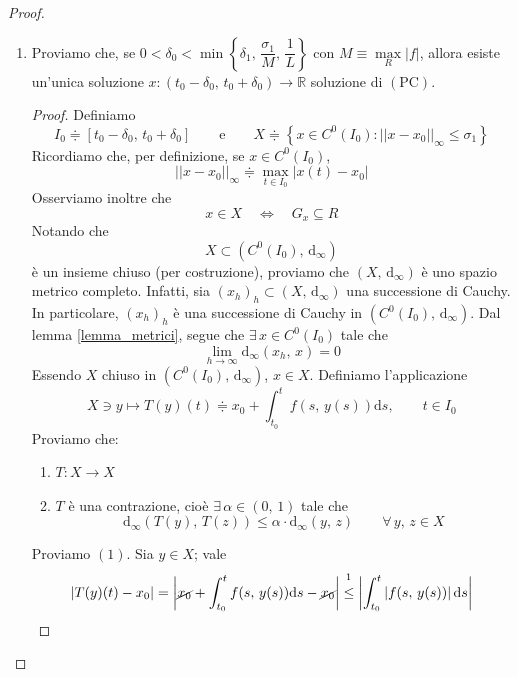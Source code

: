 \begin{proof}
\begin{enumerate}[labelindent=\parindent,leftmargin=*,label=\textnormal{\underline{Passo \arabic*}.},start=1]
	
	\item Proviamo che, se $0 < \delta_0 < \min\left\lbrace\delta_1,\,\dfrac{\sigma_1}{M},\,\dfrac{1}{L}\right\rbrace$ con $M \equiv \underset{R}{\max}|f|$, allora esiste un'unica soluzione $x: (t_0-\delta_0,\,t_0+\delta_0) \longrightarrow \mathbb{R}$ soluzione di $\mathrm{(PC)}$.
	\begin{proof}
	Definiamo
	$$
	I_0 \doteqdot [t_0-\delta_0,\,t_0+\delta_0]
	\qquad \text{e} \qquad
	X \doteqdot \left\lbrace x \in C^0(I_0) : ||x-x_0||_{\infty} \leq \sigma_1 \right\rbrace
	$$
	Ricordiamo che, per definizione, se $x \in C^0(I_0)$,
	$$
	||x-x_0||_{\infty} \doteqdot \underset{t \in I_0}{\max} |x(t) - x_0|
	$$
	Osserviamo inoltre che
	$$
	x \in X \quad \Longleftrightarrow \quad G_x \subseteq R
	$$
	Notando che
	$$
	X \subset \left( C^0(I_0),\,\mathrm{d}_{\infty} \right)
	$$
	è un insieme chiuso (per costruzione), proviamo che $\left( X,\,\mathrm{d}_{\infty} \right)$ è uno spazio metrico completo.
	Infatti, sia $(x_h)_h \subset (X,\,\mathrm{d}_{\infty})$ una successione di Cauchy. In particolare, $(x_h)_h$ è una successione di Cauchy in $\left( C^0(I_0),\,\mathrm{d}_{\infty} \right)$. Dal lemma \ref{lemma_metrici}, segue che $\exists \, x \in C^0(I_0)$ tale che
	$$
	\lim_{h \rightarrow \infty} \mathrm{d}_{\infty}(x_h,\,x) = 0
	$$
	Essendo $X$ chiuso in $\left( C^0(I_0),\,\mathrm{d}_{\infty} \right)$, $x \in X$. Definiamo l'applicazione
	$$
	X \ni y \longmapsto T(y)(t) \doteqdot x_0 + \int_{t_0}^t f(s,\,y(s))\mathrm{d}s, \qquad t \in I_0
	$$
	Proviamo che:
	\begin{enumerate}[labelindent=\parindent,leftmargin=*,label=\textnormal{(\arabic*)},start=1]
		\item $T: X \longrightarrow X$
		\item $T$ è una contrazione, cioè $\exists \, \alpha \in (0,\,1)$ tale che
		$$
		\mathrm{d}_{\infty} \left( T(y),\,T(z) \right) \leq \alpha \cdot \mathrm{d}_{\infty} (y,\,z) \qquad \forall \, y,\,z \in X
		$$
	\end{enumerate}
	Proviamo $\mathrm{(1)}$. Sia $y \in X$; vale
	$$
	\left| T(y)(t) - x_0 \right| = \left| \cancel{x_0} + \int_{t_0}^t f(s,\,y(s))\mathrm{d}s - \cancel{x_0} \right| \overset{\footnotemark}{\leq}
	\left| \int_{t_0}^t \left| f(s,\,y(s)) \right| \mathrm{d}s \right|
	$$
\end{proof}
\end{enumerate}
\end{proof}

